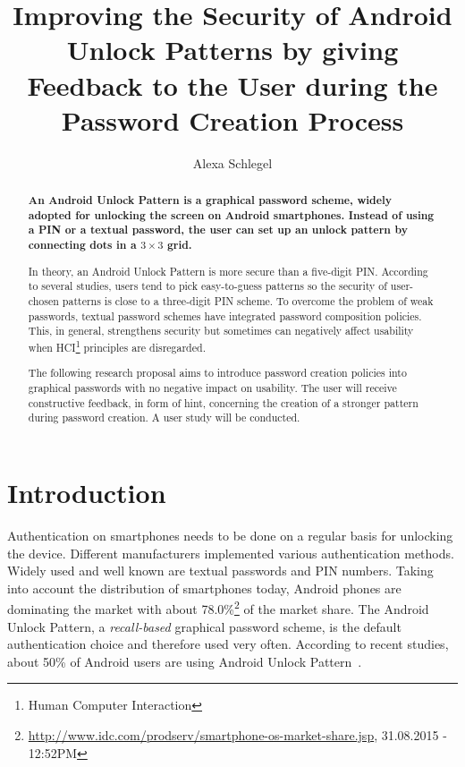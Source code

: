\documentclass[twocolumn, a4paper, 10pt]{article}
\begin{document}
\title{
	Improving the Security of Android Unlock Patterns by giving Feedback to the User during the Password Creation Process}

\author{
	Alexa Schlegel
}

\maketitle


\def\abstractname{{\textbf Abstract}}
\begin{abstract}
{
\bfseries
An Android Unlock Pattern is a graphical password scheme, widely adopted for unlocking the screen on Android smartphones. Instead of using a PIN or a textual password, the user can set up an unlock pattern by connecting dots in a $3\times3$ grid.

In theory, an Android Unlock Pattern is more secure than a five-digit PIN. According to several studies, users tend to pick easy-to-guess patterns so the security of user-chosen patterns is close to a three-digit PIN scheme. To overcome the problem of weak passwords, textual password schemes have integrated password composition policies. This, in general, strengthens security but sometimes can negatively affect usability when HCI\footnote{Human Computer Interaction} principles are disregarded.

The following research proposal aims to introduce password creation policies into graphical passwords with no negative impact on usability. The user will receive  constructive feedback, in form of hint, concerning the creation of a stronger pattern during password creation. A user study will be conducted.
}
\end{abstract}


\section{Introduction}
\label{sec:intro}

Authentication on smartphones needs to be done on a regular basis for unlocking the device. Different manufacturers implemented various authentication methods. Widely used and well known are textual passwords and PIN numbers. Taking into account the distribution of smartphones today, Android phones are dominating the market with about 78.0\%\footnote{\url{http://www.idc.com/prodserv/smartphone-os-market-share.jsp}, 31.08.2015 - 12:52PM} of the market share. The Android Unlock Pattern, a \textit{recall-based} graphical password scheme, is the default authentication choice and therefore used very often. According to recent studies, about 50\% of Android users are using Android Unlock Pattern~\cite{VanBruggen:2013:MSU:2501604.2501614, van2014studying}.
\end{document}
